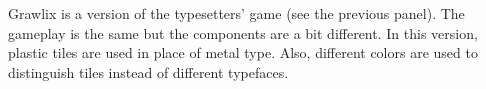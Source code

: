 Grawlix is a version of the typesetters' game (see the previous panel). The gameplay is the same but the components are a bit different. In this version, plastic tiles are used in place of metal type. Also, different colors are used to distinguish tiles instead of different typefaces.
